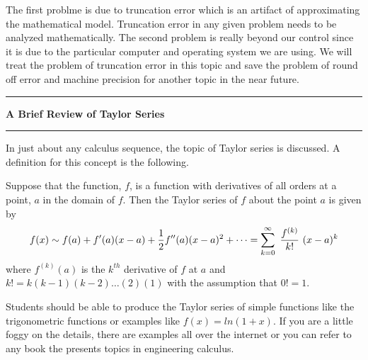 \documentclass[10pt,fleqn]{article}
\begin{document}
The first problme is due to truncation error which is an artifact of
approximating the mathematical model. Truncation error in any given problem 
needs to be analyzed mathematically. The second problem is really beyond our
control since it is due to the particular computer and operating system we are
using. We will treat the problem of truncation error in this topic and save the
problem of round off error and machine precision for another topic in the near
future.
\vskip0.1in\hrule\vskip0.1in\noindent
{\bf A Brief Review of Taylor Series} 
\vskip0.1in\hrule\vskip0.1in\noindent
In just about any calculus sequence, the topic of Taylor series is discussed. A
definition for this concept is the following.
\begin{definition}
  Suppose that the function, \(f\), is a function with derivatives of all
  orders at a point, \(a\) in the domain of \(f\). Then the Taylor series of
  \(f\) about the point \(a\) is given by
  \[
    f(x) \sim f(a) + f'(a) ( x - a ) + {1\over 2} f''(a) ( x - a )^2 + \cdots
          = \sum_{k=0}^\infty\ {{f^{(k)}}\over{k!}}\ ( x - a )^k
  \]
  where \(f^{(k)}(a)\) is the \(k^{th}\) derivative of \(f\) at \(a\) and
  \(k!=k(k-1)(k-2)\ldots (2)(1)\) with the assumption that \(0!=1\).
\end{definition}
Students should be able to produce the Taylor series of simple functions like
the trigonometric functions or examples like \(f(x)=ln(1+x)\). If you are a
little foggy on the details, there are examples all over the internet or you can
refer to any book the presents topics in engineering calculus.
\end{document}
